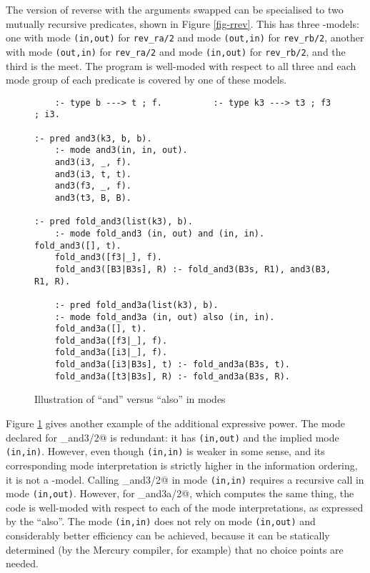 \documentclass{tlp}
\begin{document}
The version of reverse with the arguments swapped can be specialised
to two mutually recursive predicates, shown in Figure \ref{fig-rrev}.
This has three -models: one with mode \texttt{(in,out)}
for \texttt{rev\_ra/2} and mode \texttt{(out,in)} for \texttt{rev\_rb/2},
another with mode \texttt{(out,in)} for \texttt{rev\_ra/2} and mode
\texttt{(in,out)} for \texttt{rev\_rb/2}, and the third is the meet.
The program is well-moded with respect to all three and each mode group
of each predicate is covered by one of these models.

\begin{figure}
\begin{verbatim}
    :- type b ---> t ; f.          :- type k3 ---> t3 ; f3 ; i3.  

:- pred and3(k3, b, b).
    :- mode and3(in, in, out).
    and3(i3, _, f).
    and3(i3, t, t).
    and3(f3, _, f).
    and3(t3, B, B).
    
:- pred fold_and3(list(k3), b).
    :- mode fold_and3 (in, out) and (in, in).  fold_and3([], t).
    fold_and3([f3|_], f).
    fold_and3([B3|B3s], R) :- fold_and3(B3s, R1), and3(B3, R1, R).
    
    :- pred fold_and3a(list(k3), b).
    :- mode fold_and3a (in, out) also (in, in).
    fold_and3a([], t).
    fold_and3a([f3|_], f).
    fold_and3a([i3|_], f).
    fold_and3a([i3|B3s], t) :- fold_and3a(B3s, t).
    fold_and3a([t3|B3s], R) :- fold_and3a(B3s, R).
\end{verbatim}
\caption{Illustration of ``and'' versus ``also'' in modes\label{fig-and3}}
\end{figure}

Figure \ref{fig-and3} gives another example of the additional expressive
power.  The mode declared for \verb@fold_and3/2@ is redundant: it has
\texttt{(in,out)} and the implied mode \texttt{(in,in)}.  However, even
though \texttt{(in,in)} is weaker in some sense, and its corresponding
mode interpretation is strictly higher in the information ordering, it
is not a -model.  Calling \verb@fold_and3/2@ in mode
\texttt{(in,in)} requires a recursive call in mode \texttt{(in,out)}.
However, for \verb@fold_and3a/2@, which computes the same thing, the
code is well-moded with respect to each of the mode interpretations, as
expressed by the ``also''.
The mode \texttt{(in,in)} does not rely on mode \texttt{(in,out)} and
considerably better efficiency can be achieved,
because it can be statically determined (by the Mercury compiler, for
example) that no choice points are needed.
\end{document}
